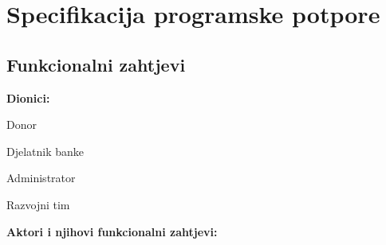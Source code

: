 \documentclass[11pt]{book}
\begin{document}
\chapter{Specifikacija programske potpore}

\section{Funkcionalni zahtjevi}

\noindent \textbf{Dionici:}

\begin{packed_enum}
	
	\item Donor		
	\item Djelatnik banke	
	\item Administrator
	\item Razvojni tim
	
\end{packed_enum}

\noindent \textbf{Aktori i njihovi funkcionalni zahtjevi:}
\end{document}
